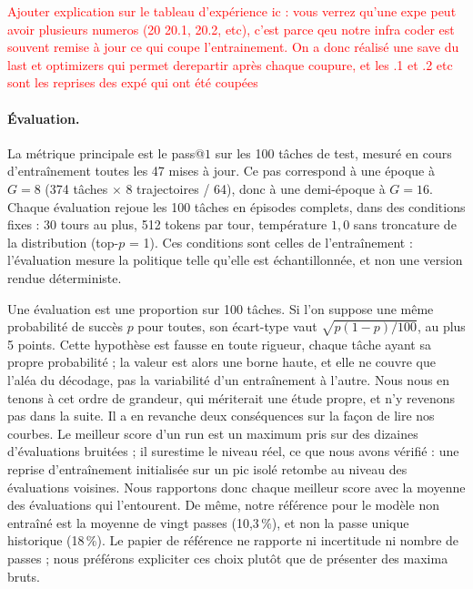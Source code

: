 \documentclass[11pt,a4paper]{article}
\begin{document}
\textcolor{red}{Ajouter explication sur le tableau d'expérience ic : vous verrez qu'une expe peut avoir plusieurs numeros (20 20.1, 20.2, etc), c'est parce qeu notre infra coder est souvent remise à jour ce qui coupe l'entrainement. On a donc réalisé une save du last et optimizers qui permet derepartir après chaque coupure, et les .1 et .2 etc sont les reprises des expé qui ont été coupées}





\paragraph{Évaluation.} La métrique principale est le pass@$1$ sur les 100 tâches de test, mesuré en cours d'entraînement toutes les 47 mises à jour. Ce pas correspond à une époque à $G=8$ (374 tâches $\times$ 8 trajectoires / 64), donc à une demi-époque à $G=16$. Chaque évaluation rejoue les 100 tâches en épisodes complets, dans des conditions fixes : 30 tours au plus, 512 tokens par tour, température $1{,}0$ sans troncature de la distribution (top-$p$ = 1). Ces conditions sont celles de l'entraînement : l'évaluation mesure la politique telle qu'elle est échantillonnée, et non une version rendue déterministe.

Une évaluation est une proportion sur 100 tâches. Si l'on suppose une même probabilité de succès $p$ pour toutes, son écart-type vaut $\sqrt{p(1-p)/100}$, au plus 5 points. Cette hypothèse est fausse en toute rigueur, chaque tâche ayant sa propre probabilité ; la valeur est alors une borne haute, et elle ne couvre que l'aléa du décodage, pas la variabilité d'un entraînement à l'autre. Nous nous en tenons à cet ordre de grandeur, qui mériterait une étude propre, et n'y revenons pas dans la suite. Il a en revanche deux conséquences sur la façon de lire nos courbes. Le meilleur score d'un run est un maximum pris sur des dizaines d'évaluations bruitées ; il surestime le niveau réel, ce que nous avons vérifié : une reprise d'entraînement initialisée sur un pic isolé retombe au niveau des évaluations voisines. Nous rapportons donc chaque meilleur score avec la moyenne des évaluations qui l'entourent. De même, notre référence pour le modèle non entraîné est la moyenne de vingt passes (10{,}3\,\%), et non la passe unique historique (18\,\%). Le papier de référence ne rapporte ni incertitude ni nombre de passes ; nous préférons expliciter ces choix plutôt que de présenter des maxima bruts.
\end{document}
